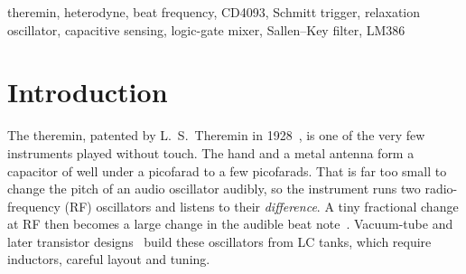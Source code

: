 \documentclass[conference]{IEEEtran}
\begin{document}
\begin{abstract}
A theremin is played without touch: the player's hand forms a small, distance-dependent capacitance with an antenna, and a heterodyne (beat-frequency) circuit turns that sub-picofarad change into an audible pitch. Classical designs need hand-wound inductors and careful LC tuning. This paper presents an inductor-free theremin in which a \emph{single} CD4093BE quad Schmitt-trigger NAND package performs every radio-frequency function: two matched $\approx$692\,kHz RC oscillators, a logic-gate mixer, and a level-shifting inverter. An MCP602 Sallen--Key filter removes the carrier, and an LM386 drives an 8\,$\Omega$ speaker, all from one 9\,V battery through a 7805 regulator. We derive (i) an oscillator model that includes Schmitt thresholds, propagation delay and the resulting threshold overshoot, which shows that the common $1/(1.2RC)$ rule overestimates the frequency by 20\%; (ii) a closed-form result showing that the filtered output of a logic-gate mixer is a \emph{triangle wave} at the beat frequency with a peak-to-peak amplitude of $V_{DD}D$, which sets the instrument's timbre; and (iii) an antenna sensitivity of 3.9\,kHz/pF. A hybrid potentiometer--antenna control scheme sets the base pitch and keeps the oscillators away from their lock-in region. A full-circuit SPICE simulation agrees with every analytical oscillator value to within 0.05\%, and a breadboard prototype produced a smooth, continuous, contactless pitch response over a 5--25\,cm hand range.
\end{abstract}

\begin{IEEEkeywords}
theremin, heterodyne, beat frequency, CD4093, Schmitt trigger, relaxation oscillator, capacitive sensing, logic-gate mixer, Sallen--Key filter, LM386
\end{IEEEkeywords}

\section{Introduction}
The theremin, patented by L.~S.~Theremin in 1928~\cite{theremin1928}, is one of the very few instruments played without touch. The hand and a metal antenna form a capacitor of well under a picofarad to a few picofarads. That is far too small to change the pitch of an audio oscillator audibly, so the instrument runs two radio-frequency (RF) oscillators and listens to their \emph{difference}. A tiny fractional change at RF then becomes a large change in the audible beat note~\cite{skeldon1998}. Vacuum-tube and later transistor designs~\cite{moog1961,glinsky2000} build these oscillators from LC tanks, which require inductors, careful layout and tuning.
\end{document}
